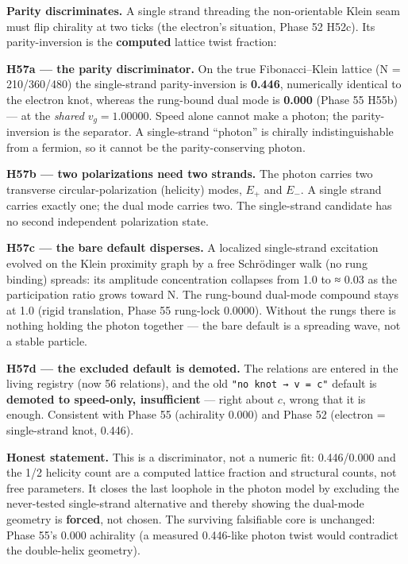 \documentclass[
]{article}
\begin{document}
\textbf{Parity discriminates.} A single strand threading the
non-orientable Klein seam must flip chirality at two ticks (the
electron's situation, Phase 52 H52c). Its parity-inversion is the
\textbf{computed} lattice twist fraction:

\textbf{H57a --- the parity discriminator.} On the true Fibonacci--Klein
lattice (N = 210/360/480) the single-strand parity-inversion is
\textbf{0.446}, numerically identical to the electron knot, whereas the
rung-bound dual mode is \textbf{0.000} (Phase 55 H55b) --- at the
\emph{shared} \(v_g = 1.00000\). Speed alone cannot make a photon; the
parity-inversion is the separator. A single-strand ``photon'' is
chirally indistinguishable from a fermion, so it cannot be the
parity-conserving photon.

\textbf{H57b --- two polarizations need two strands.} The photon carries
two transverse circular-polarization (helicity) modes, \(E_+\) and
\(E_-\). A single strand carries exactly one; the dual mode carries two.
The single-strand candidate has no second independent polarization
state.

\textbf{H57c --- the bare default disperses.} A localized single-strand
excitation evolved on the Klein proximity graph by a free Schrödinger
walk (no rung binding) spreads: its amplitude concentration collapses
from 1.0 to ≈ 0.03 as the participation ratio grows toward N. The
rung-bound dual-mode compound stays at 1.0 (rigid translation, Phase 55
rung-lock 0.0000). Without the rungs there is nothing holding the photon
together --- the bare default is a spreading wave, not a stable
particle.

\textbf{H57d --- the excluded default is demoted.} The relations are
entered in the living registry (now 56 relations), and the old
\texttt{"no\ knot\ →\ v\ =\ c"} default is \textbf{demoted to
speed-only, insufficient} --- right about \(c\), wrong that it is
enough. Consistent with Phase 55 (achirality 0.000) and Phase 52
(electron = single-strand knot, 0.446).

\textbf{Honest statement.} This is a discriminator, not a numeric fit:
0.446/0.000 and the 1/2 helicity count are a computed lattice fraction
and structural counts, not free parameters. It closes the last loophole
in the photon model by excluding the never-tested single-strand
alternative and thereby showing the dual-mode geometry is
\textbf{forced}, not chosen. The surviving falsifiable core is
unchanged: Phase 55's 0.000 achirality (a measured 0.446-like photon
twist would contradict the double-helix geometry).
\end{document}
